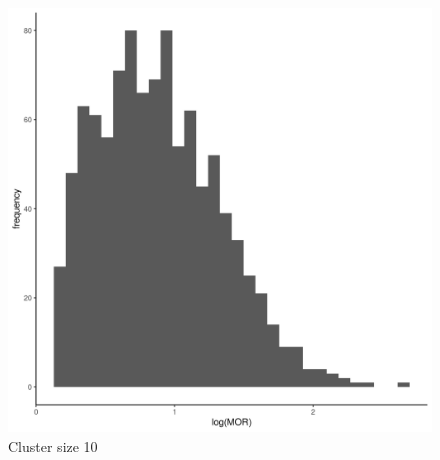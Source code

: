 \documentclass[
  letterpaper,
  DIV=11,
  numbers=noendperiod,
  titlepage]{scrartcl}
\begin{document}
\begin{figure}
\begin{minipage}[t]{0.24\linewidth}
{{\includegraphics{../../plots/two-lvl-ran-slope/low-prev/hist_50_10_two_lvl_slp_low_prev_q3.png}

}

\caption{Cluster size 10}

}

\end{minipage}%
%
\begin{minipage}[t]{0.24\linewidth}

{\centering 

}
\end{minipage}
\end{figure}
\end{document}
